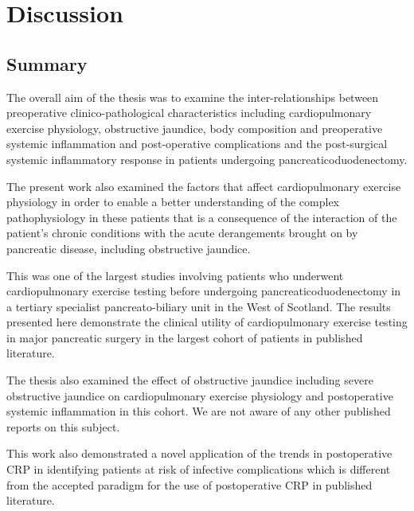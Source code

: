 
\chapter{Discussion}
\label{ch_discussion}


\clearpage
\section{Summary}

The overall aim of the thesis was to examine the inter-relationships between preoperative clinico-pathological characteristics including cardiopulmonary exercise physiology, obstructive jaundice, body composition and preoperative systemic inflammation and post-operative complications and the post-surgical systemic inflammatory response in patients undergoing pancreaticoduodenectomy.

The present work also examined the factors that affect cardiopulmonary exercise physiology in order to enable a better understanding of the complex pathophysiology in these patients that is a consequence of the interaction of the patient's chronic conditions with the acute derangements brought on by pancreatic disease, including obstructive jaundice.

This was one of the largest studies involving patients who underwent cardiopulmonary exercise testing before undergoing pancreaticoduodenectomy in a tertiary specialist pancreato-biliary unit in the West of Scotland. 
The results presented here demonstrate the clinical utility of cardiopulmonary exercise testing in major pancreatic surgery in the largest cohort of patients in published literature.

The thesis also examined the effect of obstructive jaundice including severe obstructive jaundice on cardiopulmonary exercise physiology and postoperative systemic inflammation in this cohort. 
We are not aware of any other published reports on this subject. 

This work also demonstrated a novel application of the trends in postoperative CRP in identifying patients at risk of infective complications which is different from the accepted paradigm for the use of postoperative CRP in published literature. 


